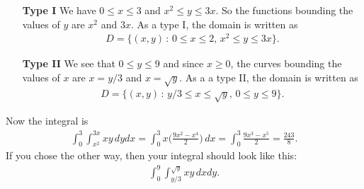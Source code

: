 	\begin{enumerate}
	\item[\textbf{Type I}] We have $0 \leq x \leq 3$ and $x^2 \leq y \leq 3x$. So the functions bounding the values of $y$ are $x^2$ and $3x$. As a type I, the domain is written as
		\begin{align*}
		D = \{ (x, y) \, : \, 0 \leq x \leq 2 \text{, } x^2 \leq y \leq 3x \} .
		\end{align*}
	\item[\textbf{Type II}] We see that $0 \leq y \leq 9$ and since $x \geq 0$, the curves bounding the values of $x$ are $x = y/3$ and $x = \sqrt{y}$. As a a type II, the domain is written as
		\begin{align*}
		D = \{ (x, y) \, : \, y/3 \leq x \leq \sqrt{y} \text{, } 0 \leq y \leq 9 \} .
		\end{align*}
	\end{enumerate}
	Now the integral is
		\begin{align*}
		\int_0^3 \int_{x^2}^{3x} xy \, dy dx = \int_0^3 x \Big(\frac{9x^2 - x^4}{2}\Big) \, dx = \int_0^3 \frac{9x^3 - x^5}{2} = \frac{243}{8} .
		\end{align*}
	If you chose the other way, then your integral should look like this:
		\begin{align*}
		\int_0^9 \int_{y/3}^{\sqrt{y}} xy \, dx dy .
		\end{align*}
		
	\spc
		
